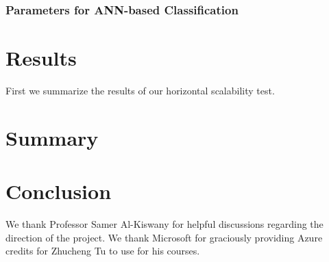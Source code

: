 \documentclass[letterpaper,twocolumn,10pt]{article}
\theoremstyle{definition}
\begin{document}
\subsubsection{Parameters for ANN-based Classification}

\section{Results}

First we summarize the results of our horizontal scalability test.

\section{Summary}


\section{Conclusion}

We thank Professor Samer Al-Kiswany for helpful discussions regarding the direction 
of the project. We thank Microsoft for graciously providing Azure credits for 
Zhucheng Tu to use for his courses.
{\footnotesize 
}
\end{document}
